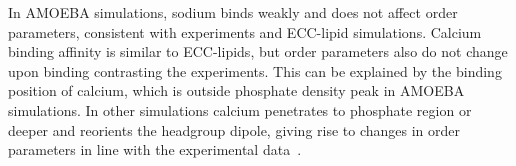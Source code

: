 \documentclass[journal=jacsat,manuscript=article,layout=singlecolumn]{achemso}
\begin{document}
%

In AMOEBA simulations, sodium binds weakly and does not affect order parameters, consistent with experiments and ECC-lipid simulations. Calcium binding affinity is similar to ECC-lipids, but order parameters also do not change upon  binding contrasting the experiments. This can be explained by the binding position of calcium, which is outside phosphate density peak in AMOEBA simulations. In other simulations calcium penetrates to phosphate region or deeper and reorients the headgroup dipole, giving rise to changes in order parameters in line with the experimental data~\cite{Catte2016}. 
\end{document}
